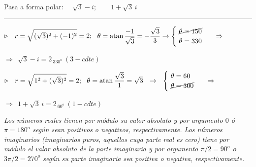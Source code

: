 \begin{miejercicio}

Pasa a forma polar: $\quad \sqrt{3}-i;\qquad 1+\sqrt{3}\, i$

\rule{250pt}{0.5pt}

\vspace{2mm} $\triangleright\quad  r=\sqrt{(\sqrt{3})^2+(-1)^2}=2;\ \ \theta=\atan \dfrac{-1}{\sqrt{3}}=-\dfrac{\sqrt{3}}{3} \to \begin{cases} \ \cancel{\theta=150} \\ \ \theta=330  \end{cases} \ \ \Rightarrow \ \  $

$\Rightarrow \ \  \sqrt{3}-i=2_{\ 330^o} \ {(3-cdte)}$	

\vspace{4mm} $\triangleright\quad r=\sqrt{1^2+(\sqrt{3})^2}=2;\ \ \theta=\atan \dfrac{\sqrt{3}}{1}=\sqrt{3}\ \  \to \ \ \begin{cases}  \ \theta=60 \\ \ \cancel{\theta=300}   \end{cases} \ \ \Rightarrow \ \  $

$\Rightarrow \ \  1+\sqrt{3}\, i=2_{\ 60^o} \ {(1-cdte)}$	

	
\end{miejercicio}

\vspace{5mm}
\begin{adjustwidth}{10pt}{10pt}
	\begin{cuadro-naranja}
		\emph{\textsf{Los números reales tienen por módulo su valor absoluto y por argumento $0$ ó $\pi=180^o$ según sean positivos o negativos, respectivamente. Los números imaginarios (imaginarios puros, aquellos cuya parte real es cero) tiene por módulo el valor absoluto de la parte imaginaria y por argumento $\pi/2=90^o$ o $3\pi/2=270^o$ según su parte imaginaria sea positiva o negativa, respectivamente.}}
	\end{cuadro-naranja}
\end{adjustwidth}

